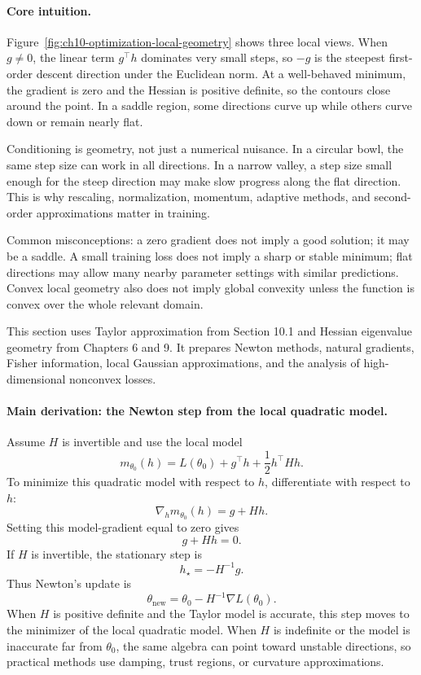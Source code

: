 \paragraph{Core intuition.}
Figure~\ref{fig:ch10-optimization-local-geometry} shows three local views. When \(g\neq0\), the linear term \(g^\top h\) dominates very small steps, so \(-g\) is the steepest first-order descent direction under the Euclidean norm. At a well-behaved minimum, the gradient is zero and the Hessian is positive definite, so the contours close around the point. In a saddle region, some directions curve up while others curve down or remain nearly flat.

Conditioning is geometry, not just a numerical nuisance. In a circular bowl, the same step size can work in all directions. In a narrow valley, a step size small enough for the steep direction may make slow progress along the flat direction. This is why rescaling, normalization, momentum, adaptive methods, and second-order approximations matter in training.

Common misconceptions: a zero gradient does not imply a good solution; it may be a saddle. A small training loss does not imply a sharp or stable minimum; flat directions may allow many nearby parameter settings with similar predictions. Convex local geometry also does not imply global convexity unless the function is convex over the whole relevant domain.

This section uses Taylor approximation from Section 10.1 and Hessian eigenvalue geometry from Chapters 6 and 9. It prepares Newton methods, natural gradients, Fisher information, local Gaussian approximations, and the analysis of high-dimensional nonconvex losses.

\paragraph{Main derivation: the Newton step from the local quadratic model.}
Assume \(H\) is invertible and use the local model
\[
m_{\theta_0}(h)=L(\theta_0)+g^\top h+\frac{1}{2}h^\top Hh.
\]
To minimize this quadratic model with respect to \(h\), differentiate with respect to \(h\):
\[
\nabla_h m_{\theta_0}(h)=g+Hh.
\]
Setting this model-gradient equal to zero gives
\[
g+Hh=0.
\]
If \(H\) is invertible, the stationary step is
\[
h_\star=-H^{-1}g.
\]
Thus Newton's update is
\[
\theta_{\text{new}}=\theta_0-H^{-1}\nabla L(\theta_0).
\]
When \(H\) is positive definite and the Taylor model is accurate, this step moves to the minimizer of the local quadratic model. When \(H\) is indefinite or the model is inaccurate far from \(\theta_0\), the same algebra can point toward unstable directions, so practical methods use damping, trust regions, or curvature approximations.

